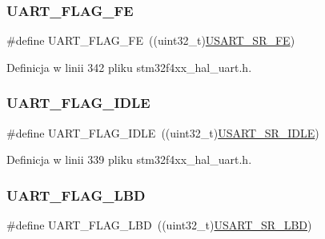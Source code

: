 \subsubsection{\texorpdfstring{U\+A\+R\+T\+\_\+\+F\+L\+A\+G\+\_\+\+FE}{UART\_FLAG\_FE}}
{\footnotesize\ttfamily \#define U\+A\+R\+T\+\_\+\+F\+L\+A\+G\+\_\+\+FE~((uint32\+\_\+t)\hyperlink{group___peripheral___registers___bits___definition_ga9eb6fd3f820bd12e0b5a981de1894804}{U\+S\+A\+R\+T\+\_\+\+S\+R\+\_\+\+FE})}



Definicja w linii 342 pliku stm32f4xx\+\_\+hal\+\_\+uart.\+h.

\mbox{\label{group___u_a_r_t___flags_ga5d7a320c505672f7508e3bd99f532a69}} 
\subsubsection{\texorpdfstring{U\+A\+R\+T\+\_\+\+F\+L\+A\+G\+\_\+\+I\+D\+LE}{UART\_FLAG\_IDLE}}
{\footnotesize\ttfamily \#define U\+A\+R\+T\+\_\+\+F\+L\+A\+G\+\_\+\+I\+D\+LE~((uint32\+\_\+t)\hyperlink{group___peripheral___registers___bits___definition_ga336fa8c9965ce18c10972ac80ded611f}{U\+S\+A\+R\+T\+\_\+\+S\+R\+\_\+\+I\+D\+LE})}



Definicja w linii 339 pliku stm32f4xx\+\_\+hal\+\_\+uart.\+h.

\mbox{\label{group___u_a_r_t___flags_ga8e3215245044c34b2d9a2698d93dfcd7}} 
\subsubsection{\texorpdfstring{U\+A\+R\+T\+\_\+\+F\+L\+A\+G\+\_\+\+L\+BD}{UART\_FLAG\_LBD}}
{\footnotesize\ttfamily \#define U\+A\+R\+T\+\_\+\+F\+L\+A\+G\+\_\+\+L\+BD~((uint32\+\_\+t)\hyperlink{group___peripheral___registers___bits___definition_ga5b868b59576f42421226d35628c6b628}{U\+S\+A\+R\+T\+\_\+\+S\+R\+\_\+\+L\+BD})}



